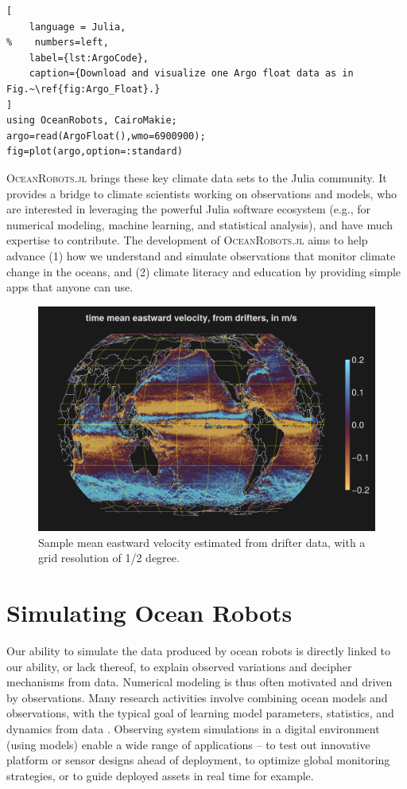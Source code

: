 \documentclass{juliacon}[12pt]
\newcommand{\pkg}[1]{{\small \textsc{#1}}}
\begin{document}
\begin{lstlisting}[
    language = Julia,
%    numbers=left,
    label={lst:ArgoCode},
    caption={Download and visualize one Argo float data as in Fig.~\ref{fig:Argo_Float}.}
]
using OceanRobots, CairoMakie;
argo=read(ArgoFloat(),wmo=6900900);
fig=plot(argo,option=:standard)
\end{lstlisting}

\pkg{OceanRobots.jl} brings these key climate data sets to the Julia community. It provides a bridge to climate scientists working on observations and models, who are interested in leveraging the powerful Julia software ecosystem (e.g., for numerical modeling, machine learning, and statistical analysis), and have much expertise to contribute. The development of \pkg{OceanRobots.jl} aims to help advance (1) how we understand and simulate observations that monitor climate change in the oceans, and (2) climate literacy and education by providing simple apps that anyone can use.

\begin{figure}[t]
\centerline{\includegraphics[width=\columnwidth]{figs/20240528_ve_mean.png}}
\caption{Sample mean eastward velocity estimated from drifter data, with a grid resolution of 1/2 degree.}
\label{fig:drifters_ve}
\end{figure}

\section{Simulating Ocean Robots}

Our ability to simulate the data produced by ocean robots is directly linked to our ability, or lack thereof, to explain observed variations and decipher mechanisms from data. Numerical modeling is thus often motivated and driven by observations. Many research activities involve combining ocean models and observations, with the typical goal of learning model parameters, statistics, and dynamics from data \cite{Forget2010,Forget2015a,FFL15,FP15,Forget2024a}. Observing system simulations in a digital environment (using models) enable a wide range of applications -- to test out innovative platform or sensor designs ahead of deployment, to optimize global monitoring strategies, or to guide deployed assets in real time for example.
\end{document}
